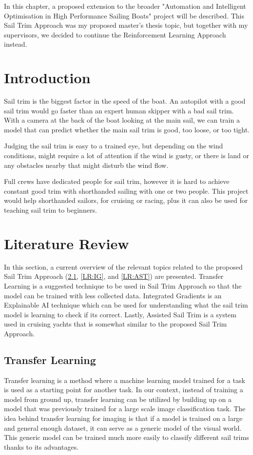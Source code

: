 In this chapter, a proposed extension to the broader "Automation and Intelligent Optimisation in High Performance Sailing Boats" project will be described. This Sail Trim Approach was my proposed master's thesis topic, but together with my supervisors, we decided to continue the Reinforcement Learning Approach instead.

\section{Introduction}
Sail trim is the biggest factor in the speed of the boat. An autopilot with a good sail trim would go faster than an expert human skipper with a bad sail trim. With a camera at the back of the boat looking at the main sail, we can train a model that can predict whether the main sail trim is good, too loose, or too tight.

Judging the sail trim is easy to a trained eye, but depending on the wind conditions, might require a lot of attention if the wind is gusty, or there is land or any obstacles nearby that might disturb the wind flow.
 
Full crews have dedicated people for sail trim, however it is hard to achieve constant good trim with shorthanded sailing with one or two people. This project would help shorthanded sailors, for cruising or racing, plus it can also be used for teaching sail trim to beginners.


\section{Literature Review}
In this section, a current overview of the relevant topics related to the proposed Sail Trim Approach (\ref{LR:TL}, \ref{LR:IG}, and \ref{LR:AST}) are presented. Transfer Learning is a suggested technique to be used in Sail Trim Approach so that the model can be trained with less collected data. Integrated Gradients is an Explainable AI technique which can be used for understanding what the sail trim model is learning to check if its correct. Lastly, Assisted Sail Trim is a system used in cruising yachts that is somewhat similar to the proposed Sail Trim Approach.

\subsection{Transfer Learning} \label{LR:TL}
Transfer learning is a method where a machine learning model trained for a task is used as a starting point for another task.\cite{brownlee_2019} In our context, instead of training a model from ground up, transfer learning can be utilized by building up on a model that was previously trained for a large scale image classification task. The idea behind transfer learning for imaging is that if a model is trained on a large and general enough dataset, it can serve as a generic model of the visual world. \cite{TF:TL} This generic model can be trained much more easily to classify different sail trims thanks to its advantages. 


